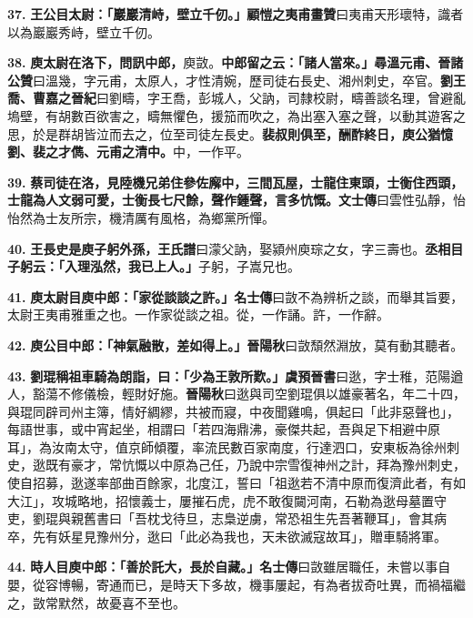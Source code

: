 \textbf{37.} \textbf{王公目太尉：「巖巖清峙，壁立千仞。」}{\footnotesize \textbf{顧愷之夷甫畫贊}曰夷甫天形瓌特，識者以為巖巖秀峙，壁立千仞。}

\textbf{38.} \textbf{庾太尉在洛下，問訊中郎，}{\footnotesize 庾敳。}\textbf{中郎留之云：「諸人當來。」尋溫元甫、}{\footnotesize \textbf{晉諸公贊}曰溫幾，字元甫，太原人，才性清婉，歷司徒右長史、湘州刺史，卒官。}\textbf{劉王喬、}{\footnotesize \textbf{曹嘉之晉紀}曰劉疇，字王喬，彭城人，父訥，司隸校尉，疇善談名理，曾避亂塢壁，有胡數百欲害之，疇無懼色，援笳而吹之，為出塞入塞之聲，以動其遊客之思，於是群胡皆泣而去之，位至司徒左長史。}\textbf{裴叔則俱至，酬酢終日，庾公猶憶劉、裴之才儁、元甫之清中。}{\footnotesize 中，一作平。}

\textbf{39.} \textbf{蔡司徒在洛，見陸機兄弟住參佐廨中，三間瓦屋，士龍住東頭，士衡住西頭，士龍為人文弱可愛，士衡長七尺餘，聲作鍾聲，言多忼慨。}{\footnotesize \textbf{文士傳}曰雲性弘靜，怡怡然為士友所宗，機清厲有風格，為鄉黨所憚。}

\textbf{40.} \textbf{王長史是庾子躬外孫，}{\footnotesize \textbf{王氏譜}曰濛父訥，娶潁州庾琮之女，字三壽也。}\textbf{丞相目子躬云：「入理泓然，我已上人。」}{\footnotesize 子躬，子嵩兄也。}

\textbf{41.} \textbf{庾太尉目庾中郎：「家從談談之許。」}{\footnotesize \textbf{名士傳}曰敳不為辨析之談，而舉其旨要，太尉王夷甫雅重之也。一作家從談之祖。從，一作誦。許，一作辭。}

\textbf{42.} \textbf{庾公目中郎：「神氣融散，差如得上。」}{\footnotesize \textbf{晉陽秋}曰敳頹然淵放，莫有動其聽者。}

\textbf{43.} \textbf{劉琨稱祖車騎為朗詣，曰：「少為王敦所歎。」}{\footnotesize \textbf{虞預晉書}曰逖，字士稚，范陽遒人，豁蕩不修儀檢，輕財好施。\textbf{晉陽秋}曰逖與司空劉琨俱以雄豪著名，年二十四，與琨同辟司州主簿，情好綢繆，共被而寢，中夜聞雞鳴，俱起曰「此非惡聲也」，每語世事，或中宵起坐，相謂曰「若四海鼎沸，豪傑共起，吾與足下相避中原耳」，為汝南太守，值京師傾覆，率流民數百家南度，行達泗口，安東板為徐州刺史，逖既有豪才，常忼慨以中原為己任，乃說中宗雪復神州之計，拜為豫州刺史，使自招募，逖遂率部曲百餘家，北度江，誓曰「祖逖若不清中原而復濟此者，有如大江」，攻城略地，招懷義士，屢摧石虎，虎不敢復闚河南，石勒為逖母墓置守吏，劉琨與親舊書曰「吾枕戈待旦，志梟逆虜，常恐祖生先吾著鞭耳」，會其病卒，先有妖星見豫州分，逖曰「此必為我也，天未欲滅寇故耳」，贈車騎將軍。}

\textbf{44.} \textbf{時人目庾中郎：「善於託大，長於自藏。」}{\footnotesize \textbf{名士傳}曰敳雖居職任，未嘗以事自嬰，從容博暢，寄通而已，是時天下多故，機事屢起，有為者拔奇吐異，而禍福繼之，敳常默然，故憂喜不至也。}

